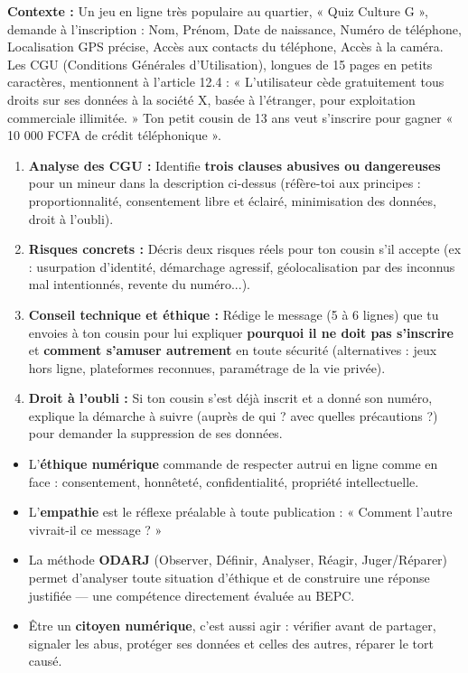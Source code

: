 \documentclass[11pt]{article}
\begin{document}
\begin{exercice}
\textbf{Contexte :} Un jeu en ligne très populaire au quartier, « Quiz Culture G », demande à l'inscription : Nom, Prénom, Date de naissance, Numéro de téléphone, Localisation GPS précise, Accès aux contacts du téléphone, Accès à la caméra. Les CGU (Conditions Générales d'Utilisation), longues de 15 pages en petits caractères, mentionnent à l'article 12.4 : « L'utilisateur cède gratuitement tous droits sur ses données à la société X, basée à l'étranger, pour exploitation commerciale illimitée. » Ton petit cousin de 13 ans veut s'inscrire pour gagner « 10 000 FCFA de crédit téléphonique ».

\begin{enumerate}
\item \textbf{Analyse des CGU :} Identifie \textbf{trois clauses abusives ou dangereuses} pour un mineur dans la description ci-dessus (réfère-toi aux principes : proportionnalité, consentement libre et éclairé, minimisation des données, droit à l'oubli).
\item \textbf{Risques concrets :} Décris deux risques réels pour ton cousin s'il accepte (ex : usurpation d'identité, démarchage agressif, géolocalisation par des inconnus mal intentionnés, revente du numéro...).
\item \textbf{Conseil technique et éthique :} Rédige le message (5 à 6 lignes) que tu envoies à ton cousin pour lui expliquer \textbf{pourquoi il ne doit pas s'inscrire} et \textbf{comment s'amuser autrement} en toute sécurité (alternatives : jeux hors ligne, plateformes reconnues, paramétrage de la vie privée).
\item \textbf{Droit à l'oubli :} Si ton cousin s'est déjà inscrit et a donné son numéro, explique la démarche à suivre (auprès de qui ? avec quelles précautions ?) pour demander la suppression de ses données.
\end{enumerate}
\end{exercice}

\begin{aretenir}
\begin{itemize}
\item L'\textbf{éthique numérique} commande de respecter autrui en ligne comme en face : consentement, honnêteté, confidentialité, propriété intellectuelle.
\item L'\textbf{empathie} est le réflexe préalable à toute publication : « Comment l'autre vivrait-il ce message ? »
\item La méthode \textbf{ODARJ} (Observer, Définir, Analyser, Réagir, Juger/Réparer) permet d'analyser toute situation d'éthique et de construire une réponse justifiée — une compétence directement évaluée au BEPC.
\item Être un \textbf{citoyen numérique}, c'est aussi agir : vérifier avant de partager, signaler les abus, protéger ses données et celles des autres, réparer le tort causé.
\end{itemize}
\end{aretenir}
\end{document}
